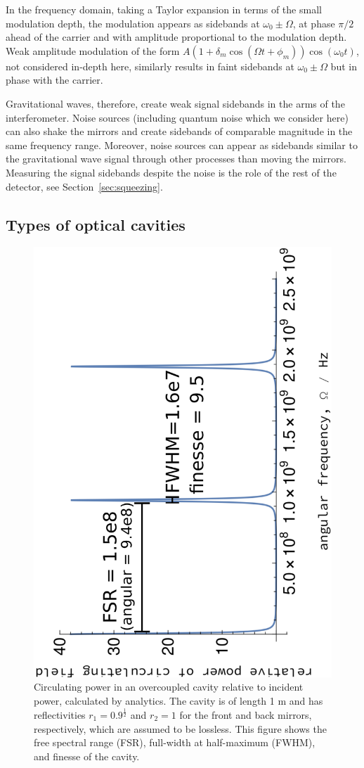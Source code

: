 \documentclass[aps,pra,superscriptaddress,reprint,nofootinbib]{revtex4-1}
\begin{document}
In the frequency domain, taking a Taylor expansion in terms of the small modulation depth, the modulation appears as sidebands at $\omega_0 \pm \Omega$, at phase $\pi/2$ ahead of the carrier and with amplitude proportional to the modulation depth.
Weak amplitude modulation of the form $A (1 + \delta_m \cos(\Omega t + \phi_m)) \cos(\omega_0 t)$, not considered in-depth here, similarly results in faint sidebands at $\omega_0 \pm \Omega$ but in phase with the carrier.


Gravitational waves, therefore, create weak signal sidebands in the arms of the interferometer. Noise sources (including quantum noise which we consider here) can also shake the mirrors and create sidebands of comparable magnitude in the same frequency range. Moreover, noise sources can appear as sidebands similar to the gravitational wave signal through other processes than moving the mirrors. Measuring the signal sidebands despite the noise is the role of the rest of the detector, see Section~\ref{sec:squeezing}.


\subsection{Types of optical cavities}

\begin{figure}[h]
	\begin{center}
	\includegraphics[height=0.45\textwidth, angle=-90]{figures/cavity_fsr_fwhm_finesse.pdf}
	\end{center}
	\caption{Circulating power in an overcoupled cavity relative to incident power, calculated by analytics. The cavity is of length 1 m and has reflectivities $r_1 = 0.9^{\frac{1}{2}}$ and $r_2 = 1$ for the front and back mirrors, respectively, which are assumed to be lossless. This figure shows the free spectral range (FSR), full-width at half-maximum (FWHM), and finesse of the cavity.}
	\label{fig:cavity_fsr_fwhm_finesse}
\end{figure}
\end{document}
